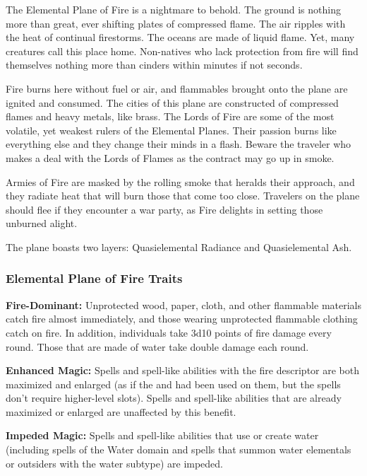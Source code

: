 The Elemental Plane of Fire is a nightmare to behold. The ground is nothing more than great, ever shifting plates of compressed flame. The air ripples with the heat of continual firestorms. The oceans are made of liquid flame. Yet, many creatures call this place home. Non-natives who lack protection from fire will find themselves nothing more than cinders within minutes if not seconds.

Fire burns here without fuel or air, and flammables brought onto the plane are ignited and consumed. The cities of this plane are constructed of compressed flames and heavy metals, like brass. The Lords of Fire are some of the most volatile, yet weakest rulers of the Elemental Planes. Their passion burns like everything else and they change their minds in a flash. Beware the traveler who makes a deal with the Lords of Flames as the contract may go up in smoke.

Armies of Fire are masked by the rolling smoke that heralds their approach, and they radiate heat that will burn those that come too close. Travelers on the plane should flee if they encounter a war party, as Fire delights in setting those unburned alight.

The plane boasts two layers: Quasielemental Radiance and Quasielemental Ash.


\subsubsection{Elemental Plane of Fire Traits}
\begin{itemize*}
\item \textbf{Fire-Dominant:} Unprotected wood, paper, cloth, and other flammable materials catch fire almost immediately, and those wearing unprotected flammable clothing catch on fire. In addition, individuals take 3d10 points of fire damage every round. Those that are made of water take double damage each round.
\item \textbf{Enhanced Magic:} Spells and spell-like abilities with the fire descriptor are both maximized and enlarged (as if the  and  had been used on them, but the spells don't require higher-level slots). Spells and spell-like abilities that are already maximized or enlarged are unaffected by this benefit.
\item \textbf{Impeded Magic:} Spells and spell-like abilities that use or create water (including spells of the Water domain and spells that summon water elementals or outsiders with the water subtype) are impeded.
\end{itemize*}


